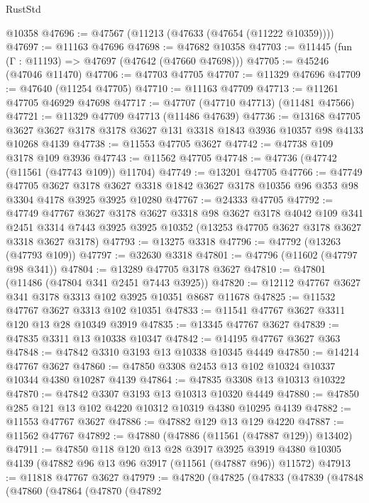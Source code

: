 \begin{lexlean}{RustStd}
\begin{coremodule}
    @10358
@47696 := @47567 (@11213 (@47633 (@47654 (@11222 @10359))))
@47697 := @11163 @47696
@47698 := @47682 @10358
@47703 := @11445 (fun (Γ : @11193) => @47697 (@47642 (@47660 @47698)))
@47705 := @45246 (@47046 @11470)
@47706 := @47703 @47705
@47707 := @11329 @47696
@47709 := @47640 (@11254 @47705)
@47710 := @11163 @47709
@47713 := @11261 @47705 @46929 @47698
@47717 := @47707 (@47710 @47713) (@11481 @47566)
@47721 := @11329 @47709 @47713 (@11486 @47639)
@47736 := @13168
    @47705
    @3627
    @3627
    @3178
    @3178
    @3627
    @131
    @3318
    @1843
    @3936
    @10357
    @98
    @4133
    @10268
    @4139
@47738 := @11553 @47705 @3627
@47742 := @47738 @109 @3178 @109 @3936
@47743 := @11562 @47705
@47748 := @47736 (@47742 (@11561 (@47743 @109)) @11704)
@47749 := @13201 @47705
@47766 := @47749
    @47705
    @3627
    @3178
    @3627
    @3318
    @1842
    @3627
    @3178
    @10356
    @96
    @353
    @98
    @3304
    @4178
    @3925
    @3925
    @10280
@47767 := @24333 @47705
@47792 := @47749
    @47767
    @3627
    @3178
    @3627
    @3318
    @98
    @3627
    @3178
    @4042
    @109
    @341
    @2451
    @3314
    @7443
    @3925
    @3925
    @10352
    (@13253 @47705 @3627 @3178 @3627 @3318 @3627 @3178)
@47793 := @13275 @3318
@47796 := @47792 (@13263 (@47793 @109))
@47797 := @32630 @3318
@47801 := @47796 (@11602 (@47797 @98 @341))
@47804 := @13289 @47705 @3178 @3627
@47810 := @47801 (@11486 (@47804 @341 @2451 @7443 @3925))
@47820 := @12112 @47767 @3627 @341 @3178 @3313 @102 @3925 @10351 @8687 @11678
@47825 := @11532 @47767 @3627 @3313 @102 @10351
@47833 := @11541 @47767 @3627 @3311 @120 @13 @28 @10349 @3919
@47835 := @13345 @47767 @3627
@47839 := @47835 @3311 @13 @10338 @10347
@47842 := @14195 @47767 @3627 @363
@47848 := @47842 @3310 @3193 @13 @10338 @10345 @4449
@47850 := @14214 @47767 @3627
@47860 := @47850 @3308 @2453 @13 @102 @10324 @10337 @10344 @4380 @10287 @4139
@47864 := @47835 @3308 @13 @10313 @10322
@47870 := @47842 @3307 @3193 @13 @10313 @10320 @4449
@47880 := @47850 @285 @121 @13 @102 @4220 @10312 @10319 @4380 @10295 @4139
@47882 := @11553 @47767 @3627
@47886 := @47882 @129 @13 @129 @4220
@47887 := @11562 @47767
@47892 := @47880 (@47886 (@11561 (@47887 @129)) @13402)
@47911 := @47850
    @118
    @120
    @13
    @28
    @3917
    @3925
    @3919
    @4380
    @10305
    @4139
    (@47882 @96 @13 @96 @3917 (@11561 (@47887 @96)) @11572)
@47913 := @11818 @47767 @3627
@47979 := @47820
    (@47825
      (@47833
        (@47839
          (@47848
            (@47860
              (@47864
                (@47870
                  (@47892

\end{coremodule}
\end{lexlean}
